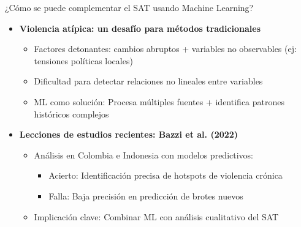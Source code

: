 \begin{frame}{¿Cómo se puede complementar el SAT usando Machine Learning?}
    \begin{itemize}
        \item \textbf{Violencia atípica: un desafío para métodos tradicionales}
        \begin{itemize}
            \item Factores detonantes: \alert{cambios abruptos} + variables no observables (ej: tensiones políticas locales)
            \item Dificultad para detectar relaciones \alert{no lineales} entre variables
            \item \alert{ML como solución}: Procesa múltiples fuentes + identifica patrones históricos complejos
        \end{itemize}
        \pause
        
        \vspace{0.1cm}
        \item \textbf{Lecciones de estudios recientes: Bazzi et al. (2022)}
        \begin{itemize}
            \item Análisis en Colombia e Indonesia con modelos predictivos:
            \begin{itemize}
                \item \alert{Acierto}: Identificación precisa de hotspots de violencia crónica
                \item \alert{Falla}: Baja precisión en predicción de brotes nuevos
            \end{itemize}
            \item Implicación clave: Combinar \alert{ML} con \alert{análisis cualitativo} del SAT
        \end{itemize}

    \end{itemize}
\end{frame}